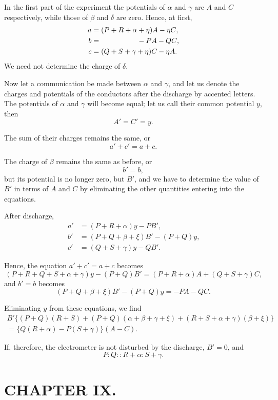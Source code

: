 \documentclass[12pt,oneside]{book}[2021/10/04]
\newcommand{\Heading}{\centering\normalfont}
\newcommand{\Chapter}[1]{\section*{\large\Heading #1}}
\newcommand{\¬}{\hphantom{0}}
\newcommand{\newchapter}{\newpage\thispagestyle{empty}}
\begin{document}
In the first part of the experiment the potentials of \(\alpha\) and \(\gamma\) are
\(A\) and \(C\) respectively, while those of \(\beta\) and \(\delta\) are zero. Hence, at
first,
\begin{align*}
  a &= (P+R+\alpha+\eta)A-\eta C\text{,}\\
  b &= \hphantom{(P+R+\alpha}-PA-QC\text{,}\\
  c &= (Q+S+\gamma+\eta)C-\eta A\text{.}
\end{align*}
We need not determine the charge of \(\delta\).

Now let a communication be made between \(\alpha\) and \(\gamma\), and let us
denote the charges and potentials of the conductors after the discharge
by accented letters. The potentials of \(\alpha\) and \(\gamma\) will become
equal; let us call their common potential \(y\), then
\[
  A' = C' = y.
\]

The sum of their charges remains the same, or
\[
  a' + c' = a + c.
\]

The charge of \(\beta\) remains the same as before, or
\[
  b' = b,
\]
but its potential is no longer zero, but \(B'\), and we have to determine
the value of \(B'\) in terms of \(A\) and \(C\) by eliminating the other
quantities entering into the equations.

After discharge,
\begin{align*}
  a' &= (P+R+\alpha)y-PB'\text{,}\\
  b' &= (P+Q+\beta+\xi)B' - (P+Q)y\text{,}\\
  c' &= (Q+S+\gamma)y-QB'\text{.}
\end{align*}

Hence, the equation \(a' + c' = a + c\) becomes
\[
(P+R+Q+S+\alpha+\gamma)y-(P+Q)B'=(P+R+\alpha)A+(Q+S+\gamma)C\text{,}
\]
and \(b' = b\) becomes
\[
(P+Q+\beta+\xi)B'-(P+Q)y = -PA-QC\text{.}
\]

Eliminating \(y\) from these equations, we find
\begin{multline*}
B'\{(P+Q)(R+S)+(P+Q)(\alpha+\beta+\gamma+\xi)+(R+S+\alpha+\gamma)(\beta+\xi)\}\\
=\{Q(R+\alpha)-P(S+\gamma)\}(A-C)\text{.}
\end{multline*}

If, therefore, the electrometer is not disturbed by the discharge,
\({B' = 0}\), and
\[
P : Q :: R + \alpha : S + \gamma\text{.}
\]

\newchapter
\Chapter{CHAPTER IX.}
\end{document}
